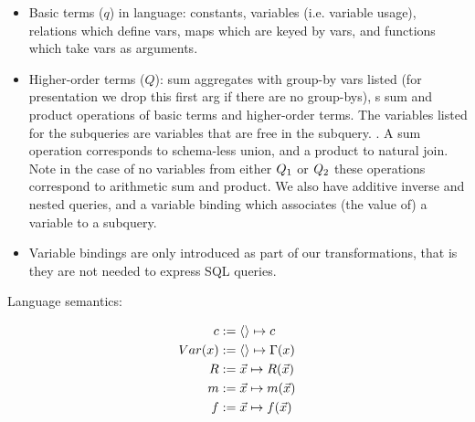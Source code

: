 \begin{itemize}
  \item Basic terms ($q$) in language: constants, variables (i.e. variable
  usage), relations which define vars, maps which are keyed by vars, and
  functions which take vars as arguments.
  \item Higher-order terms ($Q$): sum aggregates with group-by vars
  listed (for presentation we drop this first arg if there are no group-bys), s
  sum and product operations of basic terms and higher-order terms. The
  variables listed for the subqueries are variables that are free in the
  subquery. . A sum operation corresponds to schema-less union, and a product to
  natural join. Note in the case of no variables from either $Q_1$ or $Q_2$
  these operations correspond to arithmetic sum and product. We also have
  additive inverse and nested queries, and a variable binding which associates
  (the value of) a variable to a subquery.
  \item Variable bindings are only introduced as part of our transformations,
  that is they are not needed to express SQL queries.
\end{itemize}

\noindent Language semantics:

\begin{align*}
c                   := & \; \tuple{} \mapsto c\\
Var(x)              := & \; \tuple{} \mapsto \Gamma(x)\\
R                   := & \; \vec{x} \mapsto R(\vec{x})\\
m                   := & \; \vec{x} \mapsto m(\vec{x}) \\
\comment{
\theta(x,y)         := & \; \tuple{x,y} \mapsto
                           \begin{cases}
                           1 \ldots x \; \theta \; y \\
                           0 \ldots \mbox{otherwise.}
                           \end{cases}\\
\theta_c(x)         := & \; \tuple{x} \mapsto
                           \begin{cases}
                           1 \ldots x \; \theta \; c \\
                           0 \ldots \mbox{otherwise.}
                           \end{cases}\\
\calceq(\q,y)       := & \; \tuple{y} \mapsto \q(\tuple{}) \\
\calceq(x,y)        := & \; \tuple{y} \mapsto \Gamma(x) \\
}
f                   := & \; \vec{x} \mapsto f(\vec{x}) \\
\end{align*}

